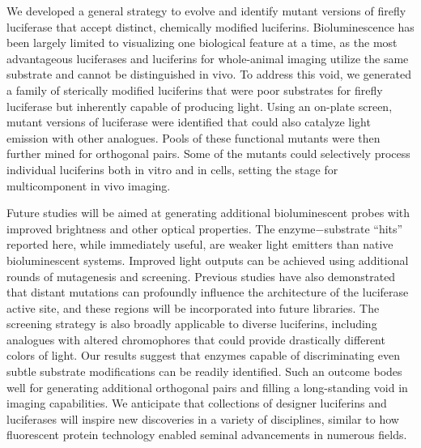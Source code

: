 We developed a general strategy to evolve and identify mutant
versions of firefly luciferase that accept distinct, chemically
modified luciferins. Bioluminescence has been largely limited to
visualizing one biological feature at a time, as the most
advantageous luciferases and luciferins for whole-animal
imaging utilize the same substrate and cannot be distinguished
in vivo. To address this void, we generated a family of sterically
modified luciferins that were poor substrates for firefly
luciferase but inherently capable of producing light. Using an
on-plate screen, mutant versions of luciferase were identified
that could also catalyze light emission with other analogues.
Pools of these functional mutants were then further mined for
orthogonal pairs. Some of the mutants could selectively process
individual luciferins both in vitro and in cells, setting the stage
for multicomponent in vivo imaging.
\par
Future studies will be aimed at generating additional
bioluminescent probes with improved brightness and other
optical properties. The enzyme−substrate “hits” reported here,
while immediately useful, are weaker light emitters than native
bioluminescent systems. Improved light outputs can be
achieved using additional rounds of mutagenesis and screening.
Previous studies have also demonstrated that distant mutations
can profoundly influence the architecture of the luciferase active
site, and these regions will be incorporated into future libraries.
The screening strategy is also broadly applicable to diverse
luciferins, including analogues with altered chromophores that
could provide drastically different colors of light. Our results suggest that enzymes capable of discriminating even subtle
substrate modifications can be readily identified. Such an
outcome bodes well for generating additional orthogonal pairs
and filling a long-standing void in imaging capabilities. We
anticipate that collections of designer luciferins and luciferases
will inspire new discoveries in a variety of disciplines, similar to
how fluorescent protein technology enabled seminal advancements
in numerous fields.




